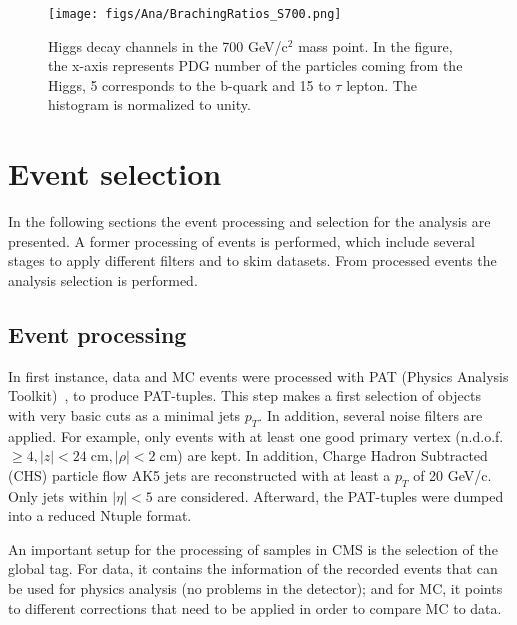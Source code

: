 \begin{figure}[!Hhtbp]
  \begin{center}
    \texttt{[image: figs/Ana/BrachingRatios\_S700.png]}
    \caption{Higgs decay channels in the 700 GeV/$\text{c}^{2}$ mass point. In the figure, the x-axis represents PDG number of the particles coming from the Higgs, 5 corresponds to the b-quark and 15 to $\tau$ lepton. The histogram is normalized to unity.}
    \label{fig:BR_Higgs_SignalSamples}
  \end{center}
\end{figure}


\section{Event selection}
\label{sec:sel}

In the following sections the event processing and selection for the analysis are presented. A former processing of events is performed, which include several stages to apply different filters and to skim datasets. From processed events the analysis selection is performed.

\subsection{Event processing}

In first instance, data and MC events were processed with PAT (Physics Analysis Toolkit)~\cite{Adam:2010zza}, to produce PAT-tuples. This step makes a first selection of objects with very basic cuts as a minimal jets $p_{T}$. In addition, several noise filters are applied. For example, only events with at least one good primary vertex (n.d.o.f. $\ge 4, |z|<24 \;\text{cm}, |\rho|< 2 \;\text{cm}$) are kept. In addition, Charge Hadron Subtracted (CHS) particle flow AK5 jets are reconstructed with at least a $p_{T}$ of 20 GeV/c. Only jets within $|\eta|<5$ are considered. Afterward, the PAT-tuples were dumped into a reduced Ntuple format. 

An important setup for the processing of samples in CMS is the selection of the global tag. For data, it contains the information of the recorded events that can be used for physics analysis (no problems in the detector); and for MC, it points to different corrections that need to be applied in order to compare MC to data.

